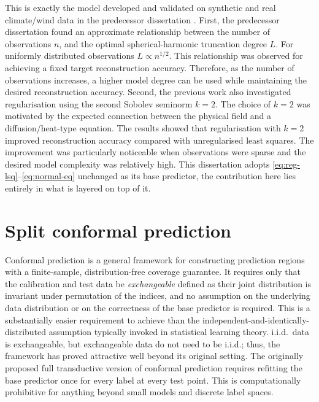 This is exactly the model developed and validated on synthetic and real climate/wind data in the predecessor dissertation \citep{thomas2025}. First, the predecessor dissertation found an approximate relationship between the number of observations $n$, and the optimal spherical-harmonic truncation degree $L$. For uniformly distributed observations $L \propto n^{1/2}$. This relationship was observed for achieving a fixed target reconstruction accuracy. Therefore, as the number of observations increases, a higher model degree can be used while maintaining the desired reconstruction accuracy. Second, the previous work also investigated regularisation using the second Sobolev seminorm $k=2$. The choice of $k=2$ was motivated by the expected connection between the physical field and a diffusion/heat-type equation. The results showed that regularisation with $k=2$ improved reconstruction accuracy compared with unregularised least squares. The improvement was particularly noticeable when observations were sparse and the desired model complexity was relatively high. This dissertation adopts \cref{eq:reg-lsq}--\cref{eq:normal-eq} unchanged as its base predictor, the contribution here lies entirely in what is layered on top of it.
 
\section{Split conformal prediction}
\label{sec:cp-background}

Conformal prediction \citep{vovk2005} is a general framework for constructing prediction regions with a finite-sample, distribution-free coverage guarantee. It requires only that the calibration and test data be \emph{exchangeable} defined as their joint distribution is invariant under permutation of the indices, and no assumption on the underlying data distribution or on the correctness of the base predictor is required. This is a substantially easier requirement to achieve than the independent-and-identically-distributed assumption typically invoked in statistical learning theory. i.i.d.\ data is exchangeable, but exchangeable data do not need to be i.i.d.; thus, the framework has proved attractive well beyond its original setting. The originally proposed full transductive version of conformal prediction requires refitting the base predictor once for every label at every test point. This is computationally prohibitive for anything beyond small models and discrete label spaces.

